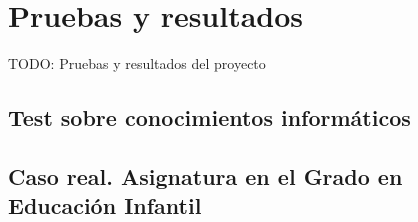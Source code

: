 \chapter{Pruebas y resultados\label{sec:pruebasYResultados}}

TODO: Pruebas y resultados del proyecto

\section{Test sobre conocimientos informáticos}

\section{Caso real. Asignatura en el Grado en Educación Infantil}